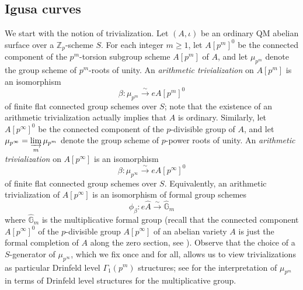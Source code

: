 \documentclass[a4paper,11pt]{amsart}
\numberwithin{equation}{section}
\theoremstyle{plain}
\theoremstyle{definition}
\theoremstyle{remark}
\newcommand{\Z}{\mathbb{Z}}
\newcommand{\dirlim}{\mathop{\varinjlim}\limits}
\begin{document}
\subsection{Igusa curves}\label{secIgusa} 
We start with the notion of trivialization. Let $(A,\iota)$ be an ordinary QM abelian surface over a $\Z_p$-scheme $S$. For each integer $m\geq 1$, let $A[p^m]^0$ be the connected component of the $p^m$-torsion subgroup scheme $A[p^m]$ of $A$, and let ${\mu}_{p^m}$ denote the group scheme of $p^m$-roots of unity. An \emph{arithmetic trivialization} on $A[p^m]$ is an isomorphism 
\[\beta\colon{\mu}_{p^m} \overset\sim\longrightarrow eA[p^m]^0\] 
of finite flat connected group schemes over $S$; note that the existence of an arithmetic trivialization actually implies that $A$ is ordinary. Similarly, let $A[p^\infty]^0$ be the connected component of the $p$-divisible group of $A$, and let ${\mu}_{p^\infty}=\dirlim_m\mu_{p^m}$ denote the group scheme of $p$-power roots of unity. An \emph{arithmetic trivialization} on $A[p^\infty]$ is an isomorphism 
\[\beta\colon{\mu}_{p^\infty} \overset\sim\longrightarrow eA[p^\infty]^0\] 
of finite flat connected group schemes over $S$. Equivalently, an arithmetic trivialization of $A[p^\infty]$ is an isomorphism of formal group schemes 
\[\phi_\beta\colon e\widehat{A}\overset\sim\longrightarrow\widehat{\mathbb{G}}_m\]
where $\widehat{\mathbb G}_m$ is the multiplicative formal group (recall that the connected component $A[p^\infty]^0$ of the $p$-divisible group $A[p^\infty]$ of an abelian variety $A$ is just the formal completion of $A$ along the zero section, see \cite[Example (b) in \S 2.3]{Tate-pdiv}). Observe that the choice of a $S$-generator of $\mu_{p^\infty}$, which we fix once and for all, allows us to view trivializations as particular Drinfeld level $\Gamma_1(p^m)$ structures; see \cite[\S1.12]{KM} for the interpretation of $\mu_{p^m}$ in terms of Drinfeld level structures for the multiplicative group.
\end{document}
